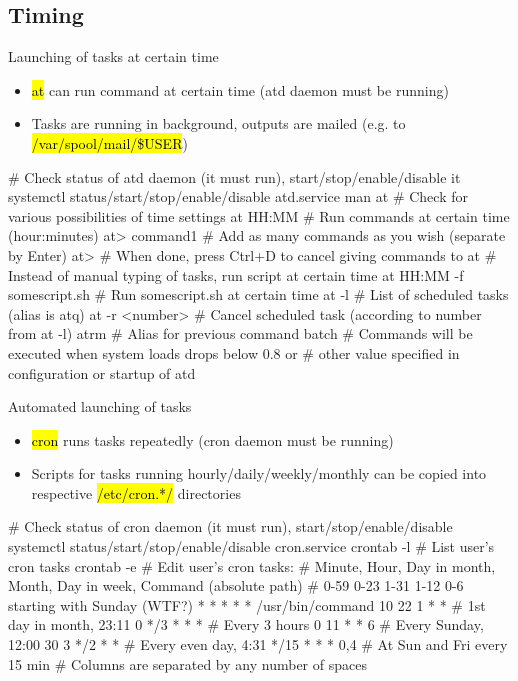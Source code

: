 \documentclass[compress, ucs, xelatex, 11pt, xcolor=svgnames,
  hyperref={
    bookmarks=true,
    unicode=true,
    colorlinks=true,
    pdftitle={Linux, command line and MetaCentrum},
    plainpages=false,
    pdfauthor={Vojtech Zeisek},
    pdfsubject={Course about use of Linux command line, writing shell scripts and using MetaCentrum of CESNET},
    pdfcreator={XeLaTeX},
    pdfkeywords={Linux, GNU, BASH, shell, command line, MetaCentrum},
    linkcolor=DarkRed,
    anchorcolor=DarkBlue,
    citecolor=Indigo,
    filecolor=NavyBlue,
    menucolor=DarkMagenta,
    urlcolor=DarkBlue,
    pdftex},
  url={hyphens, lowtilde} %
  ]{beamer}
\renewcommand{\texttt}[1]{\hl{\ttfamily #1}}
\begin{document}
\subsection{Timing}

\begin{frame}[fragile]{Launching of tasks at certain time}
  \begin{itemize}
    \item \texttt{at} can run command at certain time (atd daemon must be running)
    \item Tasks are running in background, outputs are mailed (e.g. to \texttt{/var/spool/mail/\$USER})
  \end{itemize}
  \begin{bashcode}
    # Check status of atd daemon (it must run), start/stop/enable/disable it
    systemctl status/start/stop/enable/disable atd.service
    man at # Check for various possibilities of time settings
    at HH:MM # Run commands at certain time (hour:minutes)
    at> command1 # Add as many commands as you wish (separate by Enter)
    at> # When done, press Ctrl+D to cancel giving commands to at
    # Instead of manual typing of tasks, run script at certain time
    at HH:MM -f somescript.sh # Run somescript.sh at certain time
    at -l # List of scheduled tasks (alias is atq)
    at -r <number> # Cancel scheduled task (according to number from at -l)
    atrm # Alias for previous command
    batch # Commands will be executed when system loads drops below 0.8 or
          # other value specified in configuration or startup of atd
  \end{bashcode}
\end{frame}

\begin{frame}[fragile]{Automated launching of tasks}
  \begin{itemize}
    \item \texttt{cron} runs tasks repeatedly (cron daemon must be running)
    \item Scripts for tasks running hourly/daily/weekly/monthly can be copied into respective \texttt{/etc/cron.*/} directories
  \end{itemize}
  \begin{bashcode}
    # Check status of cron daemon (it must run), start/stop/enable/disable
    systemctl status/start/stop/enable/disable cron.service
    crontab -l # List user's cron tasks
    crontab -e # Edit user's cron tasks:
    # Minute, Hour, Day in month, Month, Day in week, Command (absolute path)
    # 0-59    0-23  1-31          1-12   0-6 starting with Sunday (WTF?)
      *       *     *             *      *            /usr/bin/command
      10      22    1             *      *        # 1st day in month, 23:11
      0       */3   *             *      *        # Every 3 hours
      0       11    *             *      6        # Every Sunday, 12:00
      30      3     */2           *      *        # Every even day, 4:31
      */15    *     *             *      0,4   # At Sun and Fri every 15 min
    # Columns are separated by any number of spaces
  \end{bashcode}
\end{frame}
\end{document}

